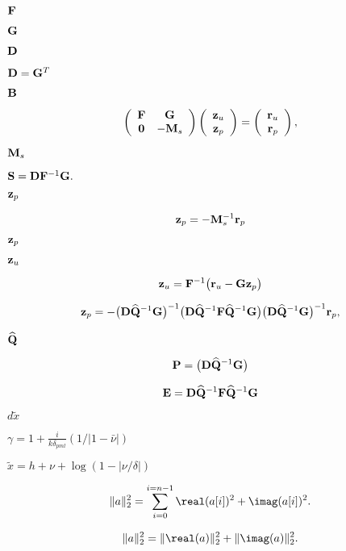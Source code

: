 \documentclass{article}
\begin{document}
$ {\bf F}$
\pagebreak

$ {\bf G} $
\pagebreak

$ {\bf D}$
\pagebreak

$ {\bf D} = {\bf G}^T $
\pagebreak

$ {\bf B} $
\pagebreak

\[ \left( \begin{array}{cc} {\bf F} & {\bf G} \\ {\bf 0} & -{\bf M}_s \end{array} \right) \left( \begin{array}{c} {\bf z}_u \\ {\bf z}_p \end{array} \right) = \left( \begin{array}{c} {\bf r}_u \\ {\bf r}_p \end{array} \right), \]
\pagebreak

${\bf M}_s$
\pagebreak

$ {\bf S} = {\bf D} {\bf F}^{-1}{\bf G}. $
\pagebreak

$ {\bf z}_p$
\pagebreak

\[ {\bf z}_p = - {\bf M}_s^{-1} {\bf r}_p \]
\pagebreak

$ {\bf z}_p $
\pagebreak

$ {\bf z}_u$
\pagebreak

\[ {\bf z}_u = {\bf F}^{-1} \big( {\bf r}_u - {\bf G} {\bf z}_p \big) \]
\pagebreak

\[ {\bf z}_p = - \big({\bf D} \widehat{\bf Q}^{-1}{\bf G} \big)^{-1} \big({\bf D} \widehat{\bf Q}^{-1}{\bf F} \widehat{\bf Q}^{-1}{\bf G}\big) \big({\bf D} \widehat{\bf Q}^{-1}{\bf G} \big)^{-1} {\bf r}_p, \]
\pagebreak

$ \widehat{\bf Q} $
\pagebreak

\[ {\bf P} = \big({\bf D} \widehat{\bf Q}^{-1}{\bf G} \big) \]
\pagebreak

\[ {\bf E}={\bf D}\widehat{\bf Q}^{-1}{\bf F}\widehat{\bf Q}^{-1}{\bf G} \]
\pagebreak

$d\tilde x $
\pagebreak

$\gamma = 1 + \frac i {k\delta_{pml}}(1/|1-\bar\nu|)$
\pagebreak

$\tilde x = h + \nu + \log(1-|\nu / \delta|)$
\pagebreak

\[ \|a\|_2^2=\sum_{i=0}^{i=n-1}\real(a[i])^2+\imag(a[i])^2. \]
\pagebreak

\[ \|a\|_2^2=\|\real(a)\|_2^2+\|\imag(a)\|_2^2. \]
\pagebreak
\end{document}

